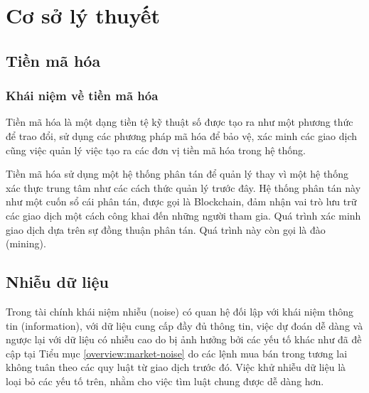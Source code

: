 \chapter{Cơ sở lý thuyết} \label{chap-Concept}

% 
% 

% 

%



\section{Tiền mã hóa} \label{concept:crypto-currency}
\subsection{Khái niệm về tiền mã hóa}
Tiền mã hóa là một dạng tiền tệ kỹ thuật số được tạo ra như một phương thức để trao đổi, sử dụng các phương pháp mã hóa để bảo vệ, xác minh các giao dịch cũng việc quản lý việc tạo ra các đơn vị tiền mã hóa trong hệ thống.

Tiền mã hóa sử dụng một hệ thống phân tán để quản lý thay vì một hệ thống xác thực trung tâm như các cách thức quản lý trước đây. Hệ thống phân tán này như một cuốn sổ cái phân tán, được gọi là Blockchain, đảm nhận vai trò lưu trữ các giao dịch một cách công khai đến những người tham gia. Quá trình xác minh giao dịch dựa trên sự đồng thuận phân tán. Quá trình này còn gọi là đào (mining).

\section{Nhiễu dữ liệu} \label{concept:noise}
Trong tài chính khái niệm nhiễu (noise) có quan hệ đối lập với khái niệm thông tin (information), với dữ liệu cung cấp đầy đủ thông tin, việc dự đoán dễ dàng và ngược lại với dữ liệu có nhiễu cao do bị ảnh hưởng bởi các yếu tố khác như đã đề cập tại Tiểu mục \ref{overview:market-noise} do các lệnh mua bán trong tương lai không tuân theo các quy luật từ giao dịch trước đó. Việc khử nhiễu dữ liệu là loại bỏ các yếu tố trên, nhằm cho việc tìm luật chung được dễ dàng hơn. %

